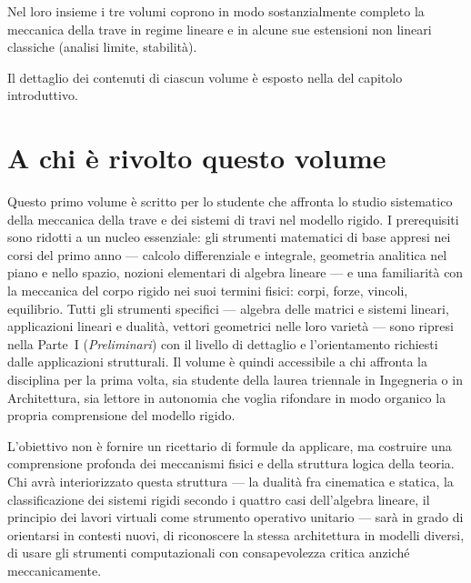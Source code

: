 Nel loro insieme i tre volumi coprono in modo
sostanzialmente completo la meccanica della trave in regime
lineare e in alcune sue estensioni non lineari classiche
(analisi limite, stabilità).

Il dettaglio dei contenuti di ciascun volume è esposto nella
 del capitolo introduttivo.



\section*{A chi è rivolto questo volume}

Questo primo volume è scritto per lo studente che affronta lo
studio sistematico della meccanica della trave e dei sistemi
di travi nel modello rigido. I prerequisiti sono ridotti a un
nucleo essenziale: gli strumenti matematici di base appresi
nei corsi del primo anno --- calcolo differenziale e
integrale, geometria analitica nel piano e nello spazio,
nozioni elementari di algebra lineare --- e una familiarità
con la meccanica del corpo rigido nei suoi termini fisici:
corpi, forze, vincoli, equilibrio. Tutti gli strumenti
specifici --- algebra delle matrici e sistemi lineari,
applicazioni lineari e dualità, vettori geometrici nelle loro
varietà --- sono ripresi nella Parte~I (\textit{Preliminari})
con il livello di dettaglio e l'orientamento richiesti dalle
applicazioni strutturali. Il volume è quindi accessibile a
chi affronta la disciplina per la prima volta, sia studente
della laurea triennale in Ingegneria o in Architettura, sia
lettore in autonomia che voglia rifondare in modo organico la
propria comprensione del modello rigido.

L'obiettivo non è fornire un ricettario di formule da
applicare, ma costruire una comprensione profonda dei
meccanismi fisici e della struttura logica della teoria. Chi
avrà interiorizzato questa struttura --- la dualità fra
cinematica e statica, la classificazione dei sistemi rigidi
secondo i quattro casi dell'algebra lineare, il principio dei
lavori virtuali come strumento operativo unitario --- sarà in
grado di orientarsi in contesti nuovi, di riconoscere la
stessa architettura in modelli diversi, di usare gli
strumenti computazionali con consapevolezza critica anziché
meccanicamente.


